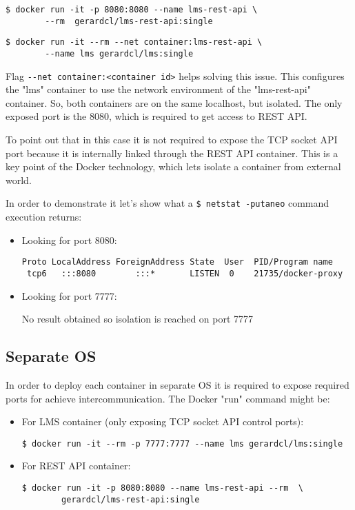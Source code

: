 \begin{verbatim}
$ docker run -it -p 8080:8080 --name lms-rest-api \
		--rm  gerardcl/lms-rest-api:single
\end{verbatim}
\begin{verbatim}
$ docker run -it --rm --net container:lms-rest-api \
		--name lms gerardcl/lms:single
\end{verbatim}

Flag \verb|--net container:<container id>| helps solving this issue. This configures the "lms" container to use the network environment of the "lms-rest-api" container. So, both containers are on the same localhost, but isolated. The only exposed port is the 8080, which is required to get access to REST API.

To point out that in this case it is not required to expose the TCP socket API port because it is internally linked through the REST API container. This is a key point of the Docker technology, which lets isolate a container from external world. 

In order to demonstrate it let's show what a \verb|$ netstat -putaneo| command  execution returns:
\begin{itemize}
\item Looking for port 8080: \hfill

\begin{verbatim}
Proto LocalAddress ForeignAddress State  User  PID/Program name 
 tcp6   :::8080        :::*       LISTEN  0    21735/docker-proxy
\end{verbatim}
\item Looking for port 7777: \hfill

No result obtained so isolation is reached on port 7777
\end{itemize}

\subsection{Separate OS}

In order to deploy each container in separate OS it is required to expose required ports for achieve intercommunication. The Docker "run" command might be:
\begin{itemize}
\item For LMS container (only exposing TCP socket API control ports): \hfill

\begin{verbatim}
$ docker run -it --rm -p 7777:7777 --name lms gerardcl/lms:single
\end{verbatim}
\item For REST API container: \hfill

\begin{verbatim}
$ docker run -it -p 8080:8080 --name lms-rest-api --rm  \
		gerardcl/lms-rest-api:single
\end{verbatim}
\end{itemize}

